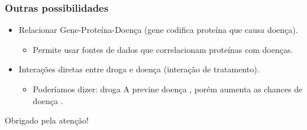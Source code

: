 \documentclass[12pt]{beamer}
\begin{document}
\begin{frame}
  \frametitle{Outras possibilidades}

  \begin{itemize}
    \item<1-> Relacionar Gene-Proteína-Doença (gene codifica proteína que causa doença).
    \begin{itemize}
      \item Permite usar fontes de dados que correlacionam proteínas com doenças.
    \end{itemize}
    \item<2-> Interações diretas entre droga e doença (interação de tratamento).
    \begin{itemize}
      \item Poderíamos dizer: droga A previne doença \textalpha, porém
            aumenta as chances de doença \textgamma.
    \end{itemize}
  \end{itemize}
\end{frame}

\begin{frame}
  \centering Obrigado pela atenção!
\end{frame}
\end{document}
